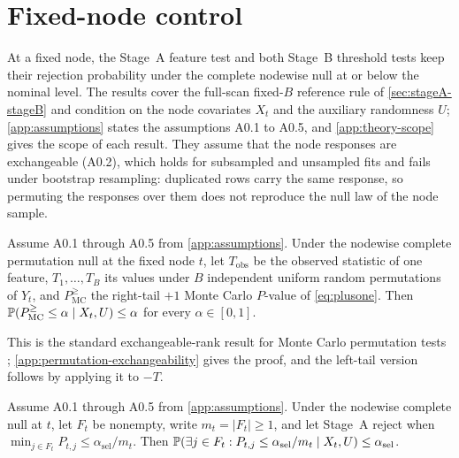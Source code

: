 \section{Fixed-node control}
\label{sec:theory}

At a fixed node, the Stage~A feature test and both Stage~B threshold tests keep
their rejection probability under the complete nodewise null at or below the
nominal level. The results cover the full-scan fixed-$B$ reference rule of
\cref{sec:stageA-stageB} and condition on the node covariates $X_t$ and the
auxiliary randomness $U$; \cref{app:assumptions} states the assumptions A0.1
to A0.5, and \cref{app:theory-scope} gives the scope of each result. They
assume that the node responses are exchangeable (A0.2), which holds for
subsampled and unsampled fits and fails under bootstrap resampling: duplicated rows carry the
same response, so permuting the responses over them does not reproduce the
null law of the node sample.

\begin{lemma}
\label{lem:plusone-superuniform}
Assume A0.1 through A0.5 from \cref{app:assumptions}. Under the nodewise
complete permutation null at the fixed node $t$, let $T_{\mathrm{obs}}$ be the
observed statistic of one feature, $T_1,\dots,T_B$ its values under $B$
independent uniform random permutations of $Y_t$, and $P_{\mathrm{MC}}^{\ge}$
the right-tail $+1$ Monte Carlo $P$-value of \cref{eq:plusone}. Then
$\mathbb{P}(P_{\mathrm{MC}}^{\ge} \le \alpha \mid X_t,U) \le \alpha$ for every
$\alpha \in [0,1]$.
\end{lemma}

This is the standard exchangeable-rank result for Monte Carlo permutation tests
\citep{NorthCurtisSham2002EmpiricalPValuesMonteCarlo,Ernst2004PermutationMethodsExactInference,HemerikGoeman2018ExactTestingRandomPermutations};
\cref{app:permutation-exchangeability} gives the proof, and the left-tail
version follows by applying it to $-T$.

\begin{corollary}
\label{cor:stageA-global-null}
Assume A0.1 through A0.5 from \cref{app:assumptions}. Under the nodewise
complete null at $t$, let $F_t$ be nonempty, write $m_t = |F_t| \ge 1$, and let
Stage~A reject when $\min_{j \in F_t} P_{t,j} \le \alpha_{\mathrm{sel}}/m_t$.
Then
$\mathbb{P}(\exists j \in F_t : P_{t,j} \le \alpha_{\mathrm{sel}}/m_t \mid X_t,U)
\le \alpha_{\mathrm{sel}}$.
\end{corollary}

